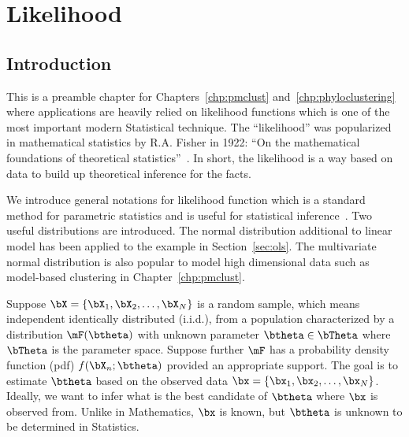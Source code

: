 
\chapter{Likelihood}
\label{chp:likelihood}




\section{Introduction}
\label{sec:likelihood_introduction}

This is a preamble chapter for Chapters~\ref{chp:pmclust}
and~\ref{chp:phyloclustering} where applications are heavily relied on
likelihood functions which is one of the most
important modern Statistical technique.
The ``likelihood'' was popularized
in mathematical statistics by R.A. Fisher in 1922:
``On the mathematical foundations of theoretical
statistics''~\citep{Fisher1922}.
In short, the likelihood is a way based on data to build up
theoretical inference for the facts.

We introduce general notations for likelihood function
which is a standard method for parametric statistics and is
useful for statistical inference~\citep{Casella2001}.
Two useful distributions are introduced.
The normal distribution additional to linear model has been applied to
the example in Section~\ref{sec:ols}.
The multivariate normal
distribution
is also popular to model high dimensional data such as
model-based clustering in Chapter~\ref{chp:pmclust}.

Suppose $\bX = \{\bX_1, \bX_2, \ldots, \bX_N\}$ is a random sample,
which means independent identically distributed
(i.i.d.),
from a population characterized by a distribution $\mF(\btheta)$ with unknown
parameter $\btheta \in \bTheta$ where $\bTheta$ is the parameter space.
Suppose further $\mF$ has a probability density function
(pdf)
$f(\bX_n; \btheta)$ provided an appropriate support.
The goal is to estimate $\btheta$ based on the observed data
$\bx = \{\bx_1, \bx_2, \ldots, \bx_N\}$.
Ideally, we want to infer what is the best candidate of $\btheta$
where $\bx$ is observed from.
Unlike in Mathematics, $\bx$ is known, but $\btheta$ is unknown
to be determined in Statistics.

